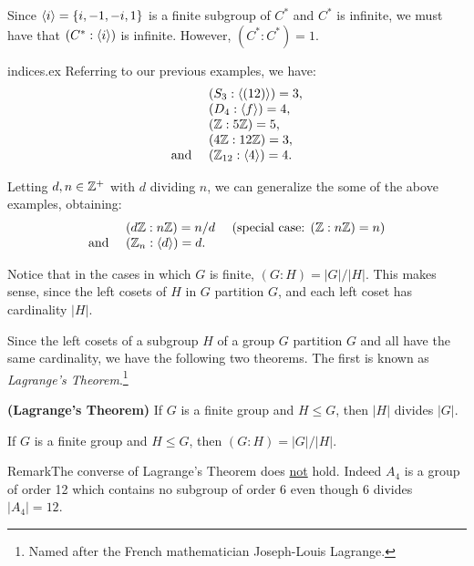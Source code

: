 \begin{example}{} Since $\langle i\rangle=\{i,-1,-i,1\}$ is a finite subgroup
of $C^*$ and $C^*$ is infinite, we must have that $(C^*:\langle i\rangle)$ is
infinite.  However, $(C^*:C^*)=1$. \end{example}

\begin{example}{indices.ex}  Referring to our previous examples, we have:
$$\begin{array}{cl} &(S_3:\langle(12)\rangle)=3,\\
&(D_4:\langle f\rangle)=4, \\
&(\mathbb{Z}:5\mathbb{Z})=5,\\
&(4\mathbb{Z}:12\mathbb{Z})=3,\\
\mbox{and }& (\mathbb{Z}_{12}:\langle4\rangle)=4.
\end{array}$$

Letting $d,n\in \mathbb{Z}^+$ with $d$ dividing $n$, we can generalize
the some of the above examples, obtaining:
$$\begin{array}{cl}
& (d\mathbb{Z}:n\mathbb{Z})=n/d \mbox{\hspace{10pt} (special case: } (\mathbb{Z}:n\mathbb{Z})=n)\\
\mbox{and } & (\mathbb{Z}_n:\langle d\rangle)=d.
\end{array}$$
\end{example}

 Notice that in the cases in which $G$ is finite,
$(G:H)=|G|/|H|$. This makes sense, since the left cosets of $H$ in $G$ partition $G$, and each left coset has cardinality $|H|$.

 Since the left cosets of a subgroup $H$ of a group $G$
partition $G$ and all have the same cardinality, we have the
following two theorems.  The first is known as \textit{Lagrange's
Theorem}.\footnote{Named after the French mathematician Joseph-Louis Lagrange.}

\begin{thm}\label{}\textbf{(Lagrange's Theorem)} If $G$ is a finite
group and $H\leq G$, then $|H|$ divides $|G|$.\end{thm}

\begin{thm}\label{indexfin} If $G$ is a finite group and $H\leq G$, then
$(G:H)=|G|/|H|$. \end{thm}

\begin{df}{Remark}The converse of
Lagrange's Theorem does \underline{not} hold. Indeed $A_4$ is a group of order 12 which contains no subgroup of
order $6$ even though $6$ divides $|A_4|=12$.\end{df}

